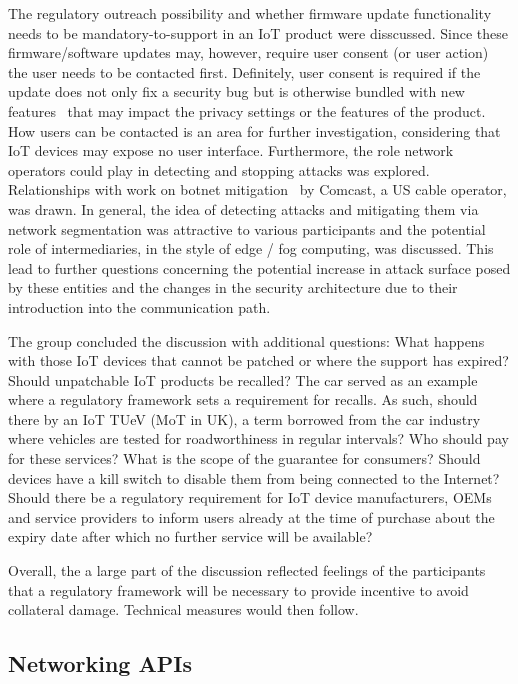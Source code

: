 The regulatory outreach possibility and whether firmware update functionality
needs to be mandatory-to-support in an IoT product were disscussed. Since
these firmware/software updates may, however, require user consent (or user
action) the user needs to be contacted first. Definitely, user consent is
required if the update does not only fix a security bug but is otherwise
bundled with new features~\cite{philips, hp} that may impact the privacy
settings or the features of the product. How users can be contacted is an area
for further investigation, considering that \ac{IoT} devices may expose no
user interface.  Furthermore, the role network operators could play in
detecting and stopping attacks was explored. Relationships with work on botnet
mitigation~\cite{rfc6561, rfc6108} by Comcast, a US cable operator, was drawn.
In general, the idea of detecting attacks and mitigating them via network
segmentation was attractive to various participants and the potential role of
intermediaries, in the style of edge / fog computing, was discussed.  This
lead to further questions concerning the potential increase in attack surface
posed by these entities and the changes in the security architecture due to
their introduction into the communication path.

The group concluded the discussion with additional questions: What happens
with those \ac{IoT} devices that cannot be patched or where the support has
expired? Should unpatchable \ac{IoT} products be recalled? The car served as
an example where a regulatory framework sets a requirement for recalls. As
such, should there by an \ac{IoT} TUeV (MoT in UK), a term borrowed from the
car industry where vehicles are tested for roadworthiness in regular
intervals?  Who should pay for these services? What is the scope of the
guarantee for consumers?  Should devices have a kill switch to disable them
from being connected to the Internet? Should there be a regulatory requirement
for \ac{IoT} device manufacturers, OEMs and service providers to inform users
already at the time of purchase about the expiry date after which no further
service will be available?

Overall, the a large part of the discussion reflected feelings of the
participants that a regulatory framework will be necessary to provide
incentive to avoid collateral damage. Technical measures would then follow.

\subsection{Networking APIs}

